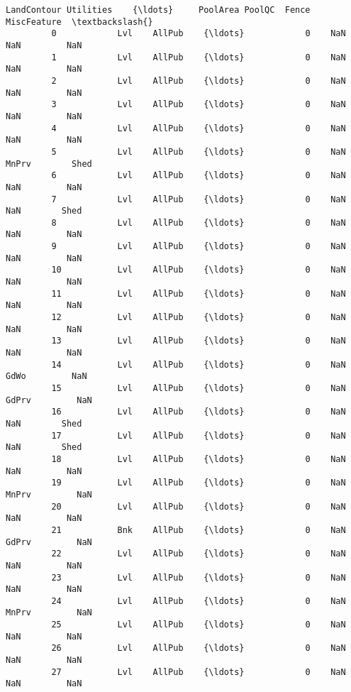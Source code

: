 \documentclass[11pt]{article}
\begin{document}
\begin{Verbatim}[commandchars=\\\{\}]
              LandContour Utilities    {\ldots}     PoolArea PoolQC  Fence MiscFeature  \textbackslash{}
         0            Lvl    AllPub    {\ldots}            0    NaN    NaN         NaN   
         1            Lvl    AllPub    {\ldots}            0    NaN    NaN         NaN   
         2            Lvl    AllPub    {\ldots}            0    NaN    NaN         NaN   
         3            Lvl    AllPub    {\ldots}            0    NaN    NaN         NaN   
         4            Lvl    AllPub    {\ldots}            0    NaN    NaN         NaN   
         5            Lvl    AllPub    {\ldots}            0    NaN  MnPrv        Shed   
         6            Lvl    AllPub    {\ldots}            0    NaN    NaN         NaN   
         7            Lvl    AllPub    {\ldots}            0    NaN    NaN        Shed   
         8            Lvl    AllPub    {\ldots}            0    NaN    NaN         NaN   
         9            Lvl    AllPub    {\ldots}            0    NaN    NaN         NaN   
         10           Lvl    AllPub    {\ldots}            0    NaN    NaN         NaN   
         11           Lvl    AllPub    {\ldots}            0    NaN    NaN         NaN   
         12           Lvl    AllPub    {\ldots}            0    NaN    NaN         NaN   
         13           Lvl    AllPub    {\ldots}            0    NaN    NaN         NaN   
         14           Lvl    AllPub    {\ldots}            0    NaN   GdWo         NaN   
         15           Lvl    AllPub    {\ldots}            0    NaN  GdPrv         NaN   
         16           Lvl    AllPub    {\ldots}            0    NaN    NaN        Shed   
         17           Lvl    AllPub    {\ldots}            0    NaN    NaN        Shed   
         18           Lvl    AllPub    {\ldots}            0    NaN    NaN         NaN   
         19           Lvl    AllPub    {\ldots}            0    NaN  MnPrv         NaN   
         20           Lvl    AllPub    {\ldots}            0    NaN    NaN         NaN   
         21           Bnk    AllPub    {\ldots}            0    NaN  GdPrv         NaN   
         22           Lvl    AllPub    {\ldots}            0    NaN    NaN         NaN   
         23           Lvl    AllPub    {\ldots}            0    NaN    NaN         NaN   
         24           Lvl    AllPub    {\ldots}            0    NaN  MnPrv         NaN   
         25           Lvl    AllPub    {\ldots}            0    NaN    NaN         NaN   
         26           Lvl    AllPub    {\ldots}            0    NaN    NaN         NaN   
         27           Lvl    AllPub    {\ldots}            0    NaN    NaN         NaN   

\end{Verbatim}
\end{document}
